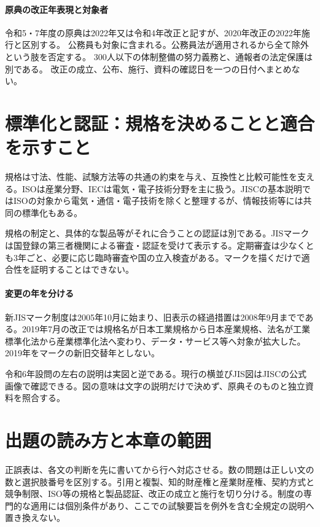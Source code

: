 \paragraph{原典の改正年表現と対象者}
令和5・7年度の原典は2022年又は令和4年改正と記すが、2020年改正の2022年施行と区別する。
公務員も対象に含まれる。公務員法が適用されるから全て除外という肢を否定する。\cite{saf53_whistle_oldpublic,caa_amend2020}
300人以下の体制整備の努力義務と、通報者の法定保護は別である。
改正の成立、公布、施行、資料の確認日を一つの日付へまとめない。

\section{標準化と認証：規格を決めることと適合を示すこと}
\label{theory:compliance:standards}
規格は寸法、性能、試験方法等の共通の約束を与え、互換性と比較可能性を支える。ISOは産業分野、IECは電気・電子技術分野を主に扱う。JISCの基本説明ではISOの対象から電気・通信・電子技術を除くと整理するが、情報技術等には共同の標準化もある\parencite{jisc_isoiec}。

規格の制定と、具体的な製品等がそれに合うことの認証は別である。JISマークは国登録の第三者機関による審査・認証を受けて表示する。定期審査は少なくとも3年ごと、必要に応じ臨時審査や国の立入検査がある\parencite{jisc_certification}。マークを描くだけで適合性を証明することはできない。

\paragraph{変更の年を分ける}
新JISマーク制度は2005年10月に始まり、旧表示の経過措置は2008年9月までである\parencite{mhlw_jis_history}。2019年7月の改正では規格名が日本工業規格から日本産業規格、法名が工業標準化法から産業標準化法へ変わり、データ・サービス等へ対象が拡大した\parencite{meti_jis2019}。2019年をマークの新旧交替年としない。

令和6年設問の左右の説明は実図と逆である。現行の横並びJIS図はJISCの公式画像で確認できる\parencite{jisc_marks}。図の意味は文字の説明だけで決めず、原典そのものと独立資料を照合する。

\section{出題の読み方と本章の範囲}
正誤表は、各文の判断を先に書いてから行へ対応させる。数の問題は正しい文の数と選択肢番号を区別する。引用と複製、知的財産権と産業財産権、契約方式と競争制限、ISO等の規格と製品認証、改正の成立と施行を切り分ける。制度の専門的な適用には個別条件があり、ここでの試験要旨を例外を含む全規定の説明へ置き換えない。


